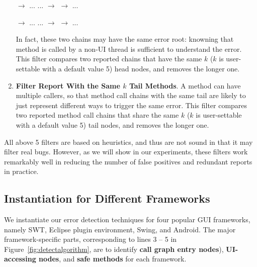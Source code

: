 \begin{enumerate}
 $\rightarrow$ ... ... $\rightarrow$  $\rightarrow$  ...

 $\rightarrow$ ... ... $\rightarrow$  $\rightarrow$  ...

In fact, these two chains may have the same error root: knowning that
method  is called by a non-UI thread is sufficient to understand
the error.
This filter compares two reported chains that have the same
$k$ ($k$ is user-settable with a default value 5) head nodes, and removes the longer one.

\item \textbf{Filter Report With the Same $k$ Tail Methods}. A method
can have multiple callers, so that method call chains with the same tail are likely
to just represent different ways to trigger the same error. This filter compares 
two reported method call chains that share the same 
$k$ ($k$ is user-settable with a default value 5) tail nodes, and removes the longer one.


\end{enumerate}

All above 5 filters are based on heuristics, and thus are not sound in
that it may filter real bugs. However, as we will show in
our experiments, these filters work remarkably well in
reducing the number of false positives and redundant reports in practice.


\subsection{Instantiation for Different Frameworks}
\label{sec:platforms}

We instantiate our error detection techniques for four popular GUI frameworks,
namely SWT, Eclipse plugin environment, Swing, and Android.
The major framework-specific parts, corresponding to
lines 3 -- 5 in Figure~\ref{fig:detectalgorithm}, are to identify
\textbf{call graph entry nodes}), \textbf{UI-accessing nodes},
and \textbf{safe methods} for each framework.





